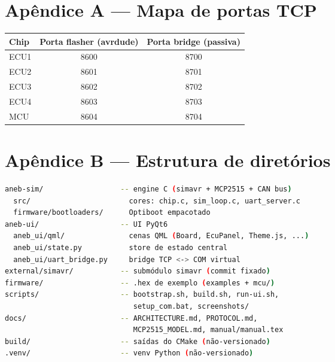 \documentclass[12pt,a4paper]{article}
\begin{document}
\section*{Apêndice A --- Mapa de portas TCP}

\begin{center}
\begin{tabular}{lcc}
\toprule
\textbf{Chip} & \textbf{Porta flasher (avrdude)} & \textbf{Porta bridge (passiva)} \\
\midrule
ECU1 & 8600 & 8700 \\
ECU2 & 8601 & 8701 \\
ECU3 & 8602 & 8702 \\
ECU4 & 8603 & 8703 \\
MCU  & 8604 & 8704 \\
\bottomrule
\end{tabular}
\end{center}

\section*{Apêndice B --- Estrutura de diretórios}

\begin{lstlisting}[language=bash]
aneb-sim/                  -- engine C (simavr + MCP2515 + CAN bus)
  src/                       cores: chip.c, sim_loop.c, uart_server.c
  firmware/bootloaders/      Optiboot empacotado
aneb-ui/                   -- UI PyQt6
  aneb_ui/qml/               cenas QML (Board, EcuPanel, Theme.js, ...)
  aneb_ui/state.py           store de estado central
  aneb_ui/uart_bridge.py     bridge TCP <-> COM virtual
external/simavr/           -- submódulo simavr (commit fixado)
firmware/                  -- .hex de exemplo (examples + mcu/)
scripts/                   -- bootstrap.sh, build.sh, run-ui.sh,
                              setup_com.bat, screenshots/
docs/                      -- ARCHITECTURE.md, PROTOCOL.md,
                              MCP2515_MODEL.md, manual/manual.tex
build/                     -- saídas do CMake (não-versionado)
.venv/                     -- venv Python (não-versionado)
\end{lstlisting}
\end{document}
